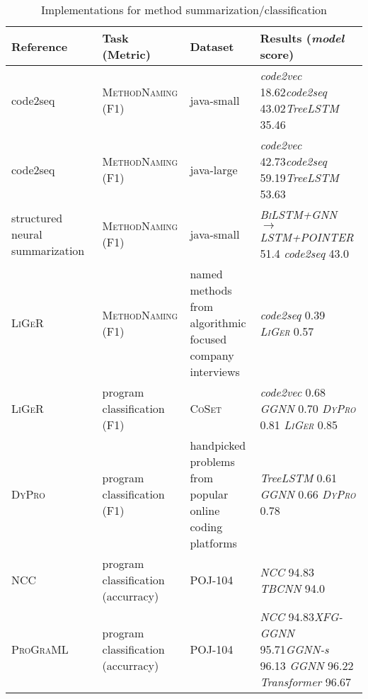 \documentclass[sigconf,authordraft=true,nonacm=true]{acmart}
\begin{document}
\begin{table*}[t]
  \begin{tabularx}{\textwidth}{p{10em}lp{12em}X}
    \toprule
    Reference                                  & Task (Metric) & Dataset & Results (\textit{model} score) \\
    \midrule
    code2seq~\cite{alon_code2seq_2019}         & \textsc{MethodNaming} (F1)
      & java-small & \textit{code2vec} 18.62\newline \textit{code2seq} 43.02\newline \textit{TreeLSTM} 35.46 \\
    code2seq~\cite{alon_code2seq_2019}         & \textsc{MethodNaming} (F1)
      & java-large & \textit{code2vec} 42.73\newline \textit{code2seq} 59.19\newline \textit{TreeLSTM} 53.63 \\
   structured neural \newline summarization~\cite{fernandes_structured_2020} & \textsc{MethodNaming} (F1) & java-small & \textit{\textsc{BiLSTM+GNN $\to$ LSTM+POINTER}} 51.4 \textit{code2seq} 43.0 \\
   \textsc{LiGeR}~\cite{wang_learning_2019-1} & \textsc{MethodNaming} (F1) & named methods from algorithmic focused company interviews &  \textit{code2seq} 0.39 \textit{\textsc{LiGer}} 0.57 \\
   \textsc{LiGeR}~\cite{wang_learning_2019-1} & program classification (F1) & \textsc{CoSet}~\cite{wang_coset_2019} &  \textit{code2vec} 0.68 \textit{GGNN} 0.70 \newline \textit{\textsc{DyPro}} 0.81 \textit{\textsc{LiGer}} 0.85 \\
    \textsc{DyPro}~\cite{wang_learning_2019}   & program classification (F1) & handpicked problems from popular online coding platforms & \textit{TreeLSTM} 0.61 \textit{GGNN} 0.66 \textit{\textsc{DyPro}} 0.78 \\
    NCC~\cite{ben-nun_neural_2018} & program classification (accurracy) & POJ-104 & \textit{NCC} 94.83 \textit{TBCNN} 94.0 \\
    \textsc{ProGraML} & program classification (accurracy) & POJ-104 & \textit{NCC} 94.83\newline \textit{XFG-GGNN} 95.71\newline \textit{GGNN-s} 96.13 \textit{GGNN} 96.22 \newline \textit{Transformer} 96.67 \\
    \bottomrule
  \end{tabularx}
  \caption{Implementations for method summarization/classification}\label{tab:app-method-summarization}
\end{table*}
\end{document}
